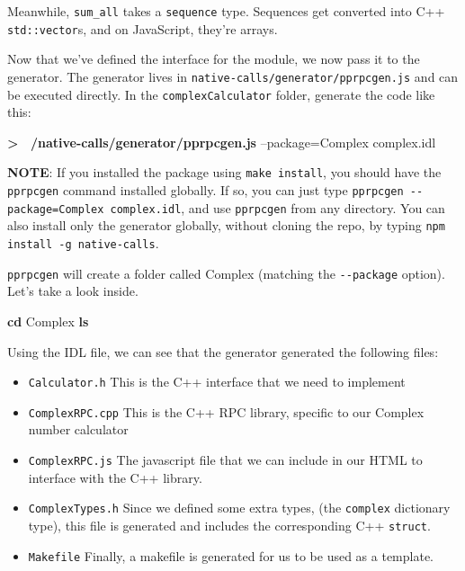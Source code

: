 \documentclass[]{article}
\newenvironment{Shaded}{}{}
\newcommand{\KeywordTok}[1]{\textcolor[rgb]{0.00,0.44,0.13}{\textbf{{#1}}}}
\newcommand{\NormalTok}[1]{{#1}}
\begin{document}
Meanwhile, \texttt{sum\_all} takes a \texttt{sequence} type. Sequences
get converted into C++ \texttt{std::vector}s, and on JavaScript, they're
arrays.


Now that we've defined the interface for the module, we now pass it to
the generator. The generator lives in
\texttt{native-calls/generator/pprpcgen.js} and can be executed
directly. In the \texttt{complexCalculator} folder, generate the code
like this:

\begin{Shaded}
\begin{Highlighting}[]
\KeywordTok{> ~/native-calls/generator/pprpcgen.js} \NormalTok{--package=Complex complex.idl}
\end{Highlighting}
\end{Shaded}

\textbf{NOTE}: If you installed the package using \texttt{make install},
you should have the \texttt{pprpcgen} command installed globally. If so,
you can just type \texttt{pprpcgen -{}-package=Complex complex.idl}, and
use \texttt{pprpcgen} from any directory. You can also install only the
generator globally, without cloning the repo, by typing
\texttt{npm install -g native-calls}.

\texttt{pprpcgen} will create a folder called Complex (matching the
\texttt{-{}-package} option). Let's take a look inside.

\begin{Shaded}
\begin{Highlighting}[]
\KeywordTok{cd} \NormalTok{Complex}
\KeywordTok{ls}
\end{Highlighting}
\end{Shaded}

Using the IDL file, we can see that the generator generated the
following files:

\begin{itemize}
\itemsep1pt\parskip0pt
\item
  \texttt{Calculator.h} This is the C++ interface that we need to
  implement
\item
  \texttt{ComplexRPC.cpp} This is the C++ RPC library, specific to our
  Complex number calculator
\item
  \texttt{ComplexRPC.js} The javascript file that we can include in our
  HTML to interface with the C++ library.
\item
  \texttt{ComplexTypes.h} Since we defined some extra types, (the
  \texttt{complex} dictionary type), this file is generated and includes
  the corresponding C++ \texttt{struct}.
\item
  \texttt{Makefile} Finally, a makefile is generated for us to be used
  as a template.
\end{itemize}
\end{document}
